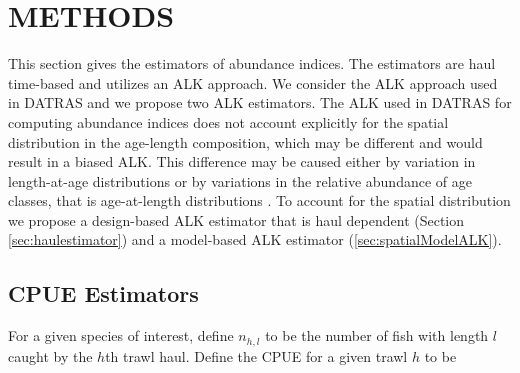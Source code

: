 \documentclass[a4paper 12pt]{article}
\numberwithin{equation}{section}
\begin{document}
%
%


%



\section{\large METHODS}
\label{sec:methods}
This section gives the estimators of abundance indices. The estimators are haul time-based and utilizes an ALK approach. We consider the ALK approach used in DATRAS and we propose two ALK estimators. The ALK used in DATRAS for computing abundance indices does not account explicitly for the spatial distribution in the age-length composition, which may be different and would result in a biased ALK. This difference may be caused either by variation in length-at-age distributions or by variations in the relative abundance of age classes, that is age-at-length distributions \citep{gerritsen2006simple}.  To account for the spatial distribution we propose a design-based ALK estimator that is haul dependent (Section \ref{sec:haulestimator}) and a model-based ALK estimator (\ref{sec:spatialModelALK}).

\subsection{CPUE Estimators}
\label{sec:cpueestimators}
For a given species of interest, define $n_{h,l}$ to be the number of fish with length $l$ caught by the $h$th trawl haul. Define the CPUE for a given trawl $h$ to be 
\end{document}
